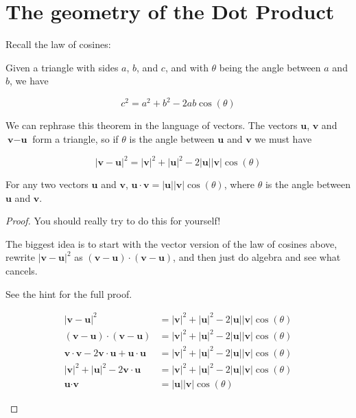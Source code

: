 \documentclass{ximera}
\begin{document}
\section{The geometry of the Dot Product}

Recall the law of cosines:

\begin{theorem}
	Given a triangle with sides $a$, $b$, and $c$, and with $\theta$ being the angle between $a$ and $b$, we have
	
	\[
	c^2 = a^2+b^2-2ab\cos(\theta)
	\]
\end{theorem}

We can rephrase this theorem in the language of vectors.  The vectors $\textbf{u}$, $\textbf{v}$ and $\textbf{v} - \textbf{u}$ form a triangle, so if $\theta$ is the angle between $\textbf{u}$ and $\textbf{v}$ we must have

\[
|\textbf{v} - \textbf{u}|^2=|\textbf{v}|^2+|\textbf{u}|^2-2|\textbf{u}||\textbf{v}|\cos(\theta)
\]



\begin{theorem}
	For any two vectors $\textbf{u}$ and $\textbf{v}$,  $\textbf{u} \cdot \textbf{v} = |\textbf{u}||\textbf{v}|\cos(\theta)$, where $\theta$ is the angle between $\textbf{u}$ and $\textbf{v}$.
\end{theorem}

\begin{proof}
	You should really try to do this for yourself!
	
	The biggest idea is to start with the vector version of the law of cosines above, rewrite $|\textbf{v} - \textbf{u}|^2$ as $(\textbf{v} - \textbf{u})\cdot(\textbf{v} - \textbf{u})$, and then just do algebra and see what cancels.
	
	See the hint for the full proof.
	
	\begin{hint}
		\begin{align*}
		|\textbf{v} - \textbf{u}|^2&=|\textbf{v}|^2+|\textbf{u}|^2-2|\textbf{u}||\textbf{v}|\cos(\theta)\\
		(\textbf{v} - \textbf{u})\cdot(\textbf{v} - \textbf{u}) &=|\textbf{v}|^2+|\textbf{u}|^2-2|\textbf{u}||\textbf{v}|\cos(\theta)\\
		\textbf{v}\cdot\textbf{v} -2\textbf{v}\cdot\textbf{u}+\textbf{u}\cdot\textbf{u}&=|\textbf{v}|^2+|\textbf{u}|^2-2|\textbf{u}||\textbf{v}|\cos(\theta)\\
		|\textbf{v}|^2+|\textbf{u}|^2 -2\textbf{v}\cdot\textbf{u} &=|\textbf{v}|^2+|\textbf{u}|^2-2|\textbf{u}||\textbf{v}|\cos(\theta)\\
		\textbf{u} \cdot \textbf{v} &= |\textbf{u}||\textbf{v}|\cos(\theta)
		\end{align*}
	
	\end{hint}
\end{proof}
\end{document}
